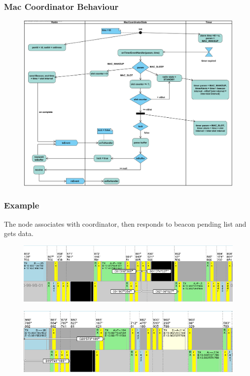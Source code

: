 \begin{frame}[fragile]
  \frametitle{Mac Coordinator Behaviour}
  \vspace{-2.7em}
  \begin{figure}
    \centering
    \includegraphics[width=.99\textwidth]{img/MAC_COORDINATOR.png}
  \end{figure}
\end{frame}

\begin{frame}[fragile]
  \frametitle{Example}
  \vspace{-2em}
  The node associates with coordinator, then responds to beacon pending list and gets data.
  \begin{figure}
    \centering
    \includegraphics[width=\textwidth]{img/associazione.png}
  \end{figure}
  \begin{figure}
    \centering
    \includegraphics[width=\textwidth]{img/dataIndirect.png}
  \end{figure}
\end{frame}


